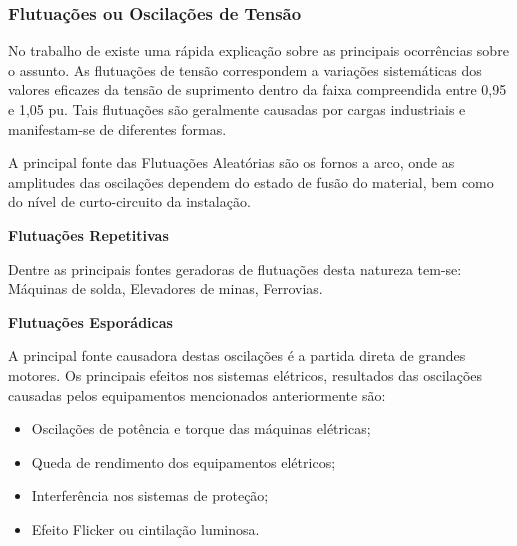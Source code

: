 \subsubsection{Flutuações ou Oscilações de Tensão}
\par
No trabalho de \cite{DEL03} existe uma rápida explicação sobre as principais ocorrências sobre o assunto. As flutuações de tensão correspondem a variações sistemáticas dos valores eficazes da tensão de suprimento dentro da faixa compreendida entre 0,95 e 1,05 pu. Tais flutuações são geralmente causadas por cargas industriais e manifestam-se de diferentes formas.
\par
A principal fonte das Flutuações Aleatórias são os fornos a arco, onde as amplitudes das oscilações dependem do estado de fusão do material, bem como do nível de curto-circuito da instalação.
\par\textbf{Flutuações Repetitivas}
\par Dentre as principais fontes geradoras de flutuações desta natureza tem-se: Máquinas de solda, Elevadores de minas, Ferrovias.
\par\textbf{Flutuações Esporádicas}
\par A principal fonte causadora destas oscilações é a partida direta de grandes motores. Os principais efeitos nos sistemas elétricos, resultados das oscilações causadas pelos equipamentos mencionados anteriormente são:
\begin{itemize}
\item Oscilações de potência e torque das máquinas elétricas;
\item Queda de rendimento dos equipamentos elétricos;
\item Interferência nos sistemas de proteção;
\item Efeito Flicker ou cintilação luminosa.
\end{itemize}

